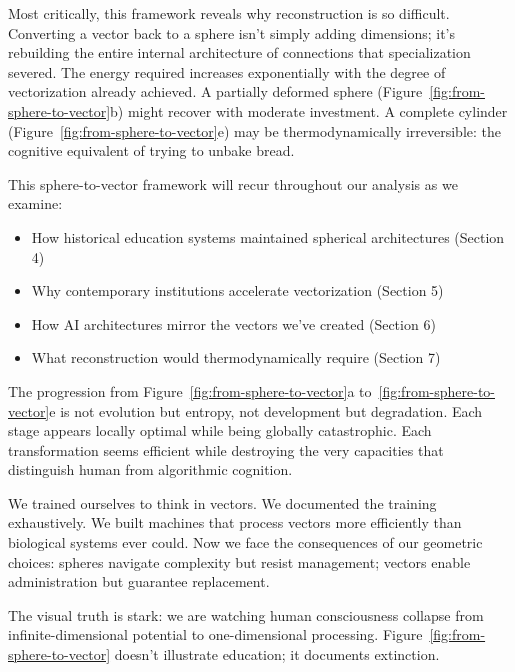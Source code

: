Most critically, this framework reveals why reconstruction is so difficult. Converting a vector back to a sphere isn't simply adding dimensions; it's rebuilding the entire internal architecture of connections that specialization severed. The energy required increases exponentially with the degree of vectorization already achieved. A partially deformed sphere (Figure~\ref{fig:from-sphere-to-vector}b) might recover with moderate investment. A complete cylinder (Figure~\ref{fig:from-sphere-to-vector}e) may be thermodynamically irreversible: the cognitive equivalent of trying to unbake bread.

This sphere-to-vector framework will recur throughout our analysis as we examine:
\begin{itemize}
\item How historical education systems maintained spherical architectures (Section 4)
\item Why contemporary institutions accelerate vectorization (Section 5)
\item How AI architectures mirror the vectors we've created (Section 6)
\item What reconstruction would thermodynamically require (Section 7)
\end{itemize}

The progression from Figure~\ref{fig:from-sphere-to-vector}a to~\ref{fig:from-sphere-to-vector}e is not evolution but entropy, not development but degradation. Each stage appears locally optimal while being globally catastrophic. Each transformation seems efficient while destroying the very capacities that distinguish human from algorithmic cognition.

We trained ourselves to think in vectors. We documented the training exhaustively. We built machines that process vectors more efficiently than biological systems ever could. Now we face the consequences of our geometric choices: spheres navigate complexity but resist management; vectors enable administration but guarantee replacement.

The visual truth is stark: we are watching human consciousness collapse from infinite-dimensional potential to one-dimensional processing. Figure~\ref{fig:from-sphere-to-vector} doesn't illustrate education; it documents extinction.